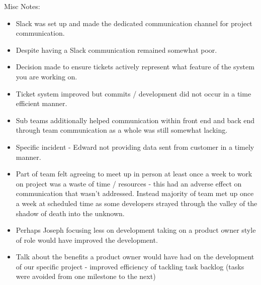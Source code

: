 \documentclass{l3proj}
\begin{document}
Misc Notes:
\begin{itemize}
\item Slack was set up and made the dedicated communication channel for project communication.
\item Despite having a Slack communication remained somewhat poor.
\item Decision made to ensure tickets actively represent what feature of the system you are working on.
\item Ticket system improved but commits / development did not occur in a time efficient manner.
\item Sub teams additionally helped communication within front end and back end through team communication as a whole was still somewhat lacking.
\item Specific incident - Edward not providing data sent from customer in a timely manner.
\item Part of team felt agreeing to meet up in person at least once a week to work on project was a waste of time / resources - this had an adverse effect on communication that wasn’t addressed. Instead majority of team met up once a week at scheduled time as some developers strayed through the valley of the shadow of death into the unknown.
\item Perhaps Joseph focusing less on development taking on a product owner style of role would have improved the development.
\item Talk about the benefits a product owner would have had on the development of our specific project - improved efficiency of tackling task backlog (tasks were avoided from one milestone to the next) 
\end{itemize}

\end{document}
